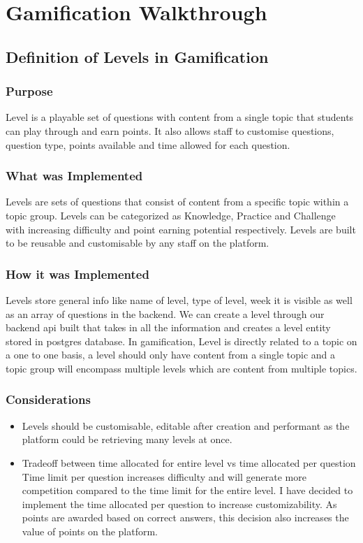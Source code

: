 \newpage
\section{Gamification Walkthrough}

\subsection{Definition of Levels in Gamification }

\subsubsection{Purpose}
Level is a playable set of questions with content from a single topic that students can play through and earn points. It also allows staff to customise questions, question type, points available and time allowed for each question.

\subsubsection{What was Implemented}
Levels are sets of questions that consist of content from a specific topic within a topic group. Levels can be categorized as Knowledge, Practice and Challenge with increasing difficulty and point earning potential respectively. Levels are built to be reusable and customisable by any staff on the platform.

\subsubsection{How it was Implemented}
Levels store general info like name of level, type of level, week it is visible as well as an array of questions in the backend. We can create a level through our backend api built that takes in all the information and creates a level entity stored in postgres database. In gamification, Level is directly related to a topic on a one to one basis, a level should only have content from a single topic and a topic group will encompass multiple levels which are content from multiple topics.

\subsubsection{Considerations}
\begin{itemize}
    \item Levels should be customisable, editable after creation and performant as the platform could be retrieving many levels at once.
    \item Tradeoff between time allocated for entire level vs time allocated per question
Time limit per question increases difficulty and will generate more competition compared to the time limit for the entire level. I have decided to implement the time allocated per question to increase customizability. As points are awarded based on correct answers, this decision also increases the value of points on the platform.
\end{itemize}

